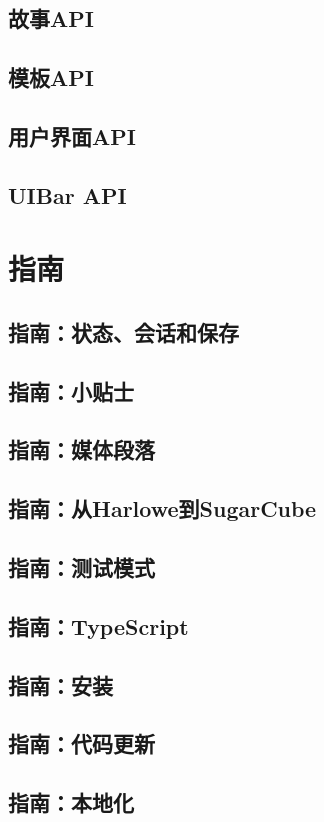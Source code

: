 \documentclass[hyperref,UTF8]{ctexart}
\begin{document}
\newpage
\subsection{故事API}

\newpage
\subsection{模板API}

\newpage
\subsection{用户界面API}

\newpage
\subsection{UIBar API}

\newpage
\section{指南}
\subsection{指南：状态、会话和保存}

\newpage
\subsection{指南：小贴士}

\newpage
\subsection{指南：媒体段落}

\newpage
\subsection{指南：从Harlowe到SugarCube}

\newpage
\subsection{指南：测试模式}

\newpage
\subsection{指南：TypeScript}

\newpage
\subsection{指南：安装}

\newpage
\subsection{指南：代码更新}

\newpage
\subsection{指南：本地化}

\newpage
\nocite{SCv2Doc}
\printbibliography[title=参考文献]
\end{document}

